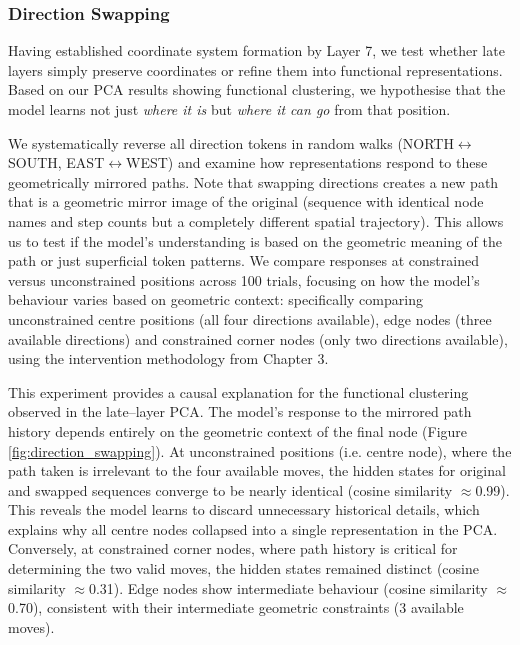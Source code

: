\subsubsection{Direction Swapping}

Having established coordinate system formation by Layer 7, we test whether late layers simply preserve coordinates or refine them into functional representations. Based on our PCA results showing functional clustering, we hypothesise that the model learns not just \textit{where it is} but \textit{where it can go} from that position.

We systematically reverse all direction tokens in random walks (NORTH$\leftrightarrow$SOUTH, EAST$\leftrightarrow$WEST) and examine how representations respond to these geometrically mirrored paths. Note that swapping directions creates a new path that is a geometric mirror image of the original (sequence with identical node names and step counts but a completely different spatial trajectory). This allows us to test if the model's understanding is based on the geometric meaning of the path or just superficial token patterns. We compare responses at constrained versus unconstrained positions across 100 trials, focusing on how the model's behaviour varies based on geometric context: specifically comparing unconstrained centre positions (all four directions available), edge nodes (three available directions) and constrained corner nodes (only two directions available), using the intervention methodology from Chapter 3.

This experiment provides a causal explanation for the functional clustering observed in the late--layer PCA. The model's response to the mirrored path history depends entirely on the geometric context of the final node (Figure \ref{fig:direction_swapping}). At unconstrained positions (i.e. centre node), where the path taken is irrelevant to the four available moves, the hidden states for original and swapped sequences converge to be nearly identical (cosine similarity $\approx$0.99). This reveals the model learns to discard unnecessary historical details, which explains why all centre nodes collapsed into a single representation in the PCA. Conversely, at constrained corner nodes, where path history is critical for determining the two valid moves, the hidden states remained distinct (cosine similarity $\approx$0.31). Edge nodes show intermediate behaviour (cosine similarity $\approx$0.70), consistent with their intermediate geometric constraints (3 available moves).


